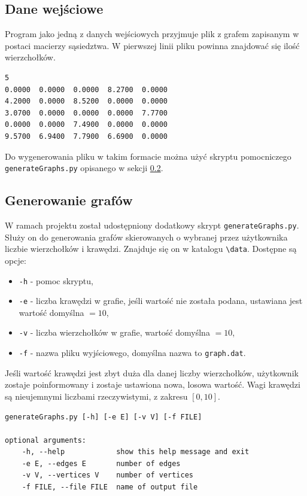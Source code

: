 \documentclass[12pt]{article}
\begin{document}
\subsection{Dane wejściowe}
Program jako jedną z danych wejściowych przyjmuje plik z grafem zapisanym w postaci macierzy sąsiedztwa.
W pierwszej linii pliku powinna znajdować się ilość wierzchołków.

\begin{lstlisting}[caption={Przykładowy graf zapisany w odpowiednim formacie.}, captionpos=b ]
5
0.0000  0.0000  0.0000  8.2700  0.0000
4.2000  0.0000  8.5200  0.0000  0.0000
3.0700  0.0000  0.0000  0.0000  7.7700
0.0000  0.0000  7.4900  0.0000  0.0000
9.5700  6.9400  7.7900  6.6900  0.0000
\end{lstlisting}

Do wygenerowania pliku w takim formacie można użyć skryptu pomocniczego \lstinline|generateGraphs.py| opisanego w sekcji \ref{sec:gen_g}.

\subsection{Generowanie grafów} \label{sec:gen_g}
W ramach projektu został udostępniony dodatkowy skrypt  \lstinline|generateGraphs.py|. Służy on do generowania grafów skierowanych o wybranej przez użytkownika liczbie wierzchołków i krawędzi. Znajduje się on w katalogu \lstinline|\data|. Dostępne są opcje:
\begin{itemize}
\item \lstinline|-h| - pomoc skryptu,
\item \lstinline|-e| - liczba krawędzi w grafie, jeśli wartość nie została podana, ustawiana jest wartość domyślna $=10$,
\item \lstinline|-v| - liczba wierzchołków w grafie, wartość domyślna $=10$,
\item \lstinline|-f| - nazwa pliku wyjściowego, domyślna nazwa to \lstinline{graph.dat}.
\end{itemize}

Jeśli wartość krawędzi jest zbyt duża dla danej liczby wierzchołków, użytkownik zostaje poinformowany i zostaje ustawiona nowa, losowa wartość. Wagi krawędzi są nieujemnymi liczbami rzeczywistymi, z zakresu $[0, 10]$.

\begin{lstlisting}[caption={Pomoc skryptu \lstinline|generateGraphs.py|.}, captionpos=b ]
generateGraphs.py [-h] [-e E] [-v V] [-f FILE]

optional arguments:
	-h, --help            show this help message and exit
	-e E, --edges E       number of edges
	-v V, --vertices V    number of vertices
	-f FILE, --file FILE  name of output file
\end{lstlisting}
\end{document}
